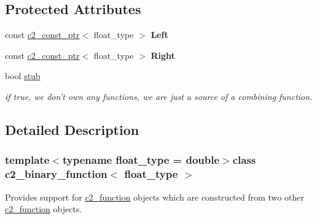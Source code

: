 \subsection*{Protected Attributes}
\begin{DoxyCompactItemize}
\item 
\hypertarget{classc2__binary__function_a53d43543e7057fe762fd14ae58ac327a}{const \hyperlink{classc2__const__ptr}{c2\-\_\-const\-\_\-ptr}$<$ float\-\_\-type $>$ {\bfseries Left}}\label{classc2__binary__function_a53d43543e7057fe762fd14ae58ac327a}

\item 
\hypertarget{classc2__binary__function_a52b7fcaed6a4c3e3146dea43f562db8d}{const \hyperlink{classc2__const__ptr}{c2\-\_\-const\-\_\-ptr}$<$ float\-\_\-type $>$ {\bfseries Right}}\label{classc2__binary__function_a52b7fcaed6a4c3e3146dea43f562db8d}

\item 
\hypertarget{classc2__binary__function_a7d6abdb0e7fcfb4fd65833a42f93c561}{bool \hyperlink{classc2__binary__function_a7d6abdb0e7fcfb4fd65833a42f93c561}{stub}}\label{classc2__binary__function_a7d6abdb0e7fcfb4fd65833a42f93c561}

\begin{DoxyCompactList}\small\item\em if true, we don't own any functions, we are just a source of a combining function. \end{DoxyCompactList}\end{DoxyCompactItemize}


\subsection{Detailed Description}
\subsubsection*{template$<$typename float\-\_\-type = double$>$class c2\-\_\-binary\-\_\-function$<$ float\-\_\-type $>$}

Provides support for \hyperlink{classc2__function}{c2\-\_\-function} objects which are constructed from two other \hyperlink{classc2__function}{c2\-\_\-function} objects. 

